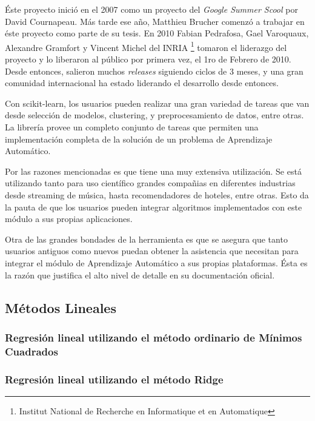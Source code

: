  \par Éste proyecto inició en el 2007 como un proyecto del \textit{Google Summer Scool} por David
    Cournapeau. Más tarde ese año, Matthieu Brucher comenzó a trabajar en éste proyecto
    como parte de su tesis. En 2010 Fabian Pedrafosa, Gael Varoquaux, Alexandre
    Gramfort y Vincent Michel del INRIA \footnote{Institut National de Recherche
    en Informatique et en Automatique} tomaron el liderazgo del proyecto y lo liberaron
    al público por primera vez, el 1ro de Febrero de 2010. Desde entonces, salieron muchos
    \textit{releases} siguiendo ciclos de 3 meses, y una gran comunidad internacional
    ha estado liderando el desarrollo desde entonces.

  \par Con scikit-learn, los usuarios pueden realizar una gran variedad de tareas
    que van desde selección de modelos, clustering, y preprocesamiento de datos, entre otras.
    La librería provee un completo conjunto de tareas que permiten una
    implementación completa de la solución de un problema de Aprendizaje Automático.

    Por las razones mencionadas es que tiene una muy extensiva utilización.
    Se está utilizando tanto para uso científico
    grandes compañias en diferentes industrias desde streaming de música, hasta
    recomendadores de hoteles, entre otras. Esto da la pauta de que los usuarios pueden
    integrar algoritmos implementados con este módulo a sus propias aplicaciones.

Otra de las grandes bondades de la herramienta es que se asegura que tanto usuarios
antiguos como nuevos puedan obtener la asistencia que necesitan para integrar
el módulo de Aprendizaje Automático a sus propias plataformas. Ésta es la razón
que justifica el alto nivel de detalle en su documentación oficial.



\subsection{Métodos Lineales}

\subsubsection{Regresión lineal utilizando el método ordinario de Mínimos Cuadrados}

\subsubsection{Regresión lineal utilizando el método Ridge}


